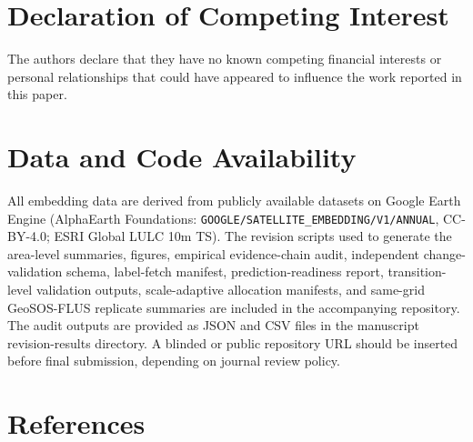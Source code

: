 \documentclass{article}
\begin{document}
\section*{Declaration of Competing Interest}
The authors declare that they have no known competing financial interests or personal relationships that could have appeared to influence the work reported in this paper.

\section*{Data and Code Availability}
All embedding data are derived from publicly available datasets on Google Earth Engine (AlphaEarth Foundations: \texttt{GOOGLE/SATELLITE\_EMBEDDING/V1/ANNUAL}, CC-BY-4.0; ESRI Global LULC 10m TS). The revision scripts used to generate the area-level summaries, figures, empirical evidence-chain audit, independent change-validation schema, label-fetch manifest, prediction-readiness report, transition-level validation outputs, scale-adaptive allocation manifests, and same-grid GeoSOS-FLUS replicate summaries are included in the accompanying repository. The audit outputs are provided as JSON and CSV files in the manuscript revision-results directory. A blinded or public repository URL should be inserted before final submission, depending on journal review policy.


\section*{References}
\end{document}
